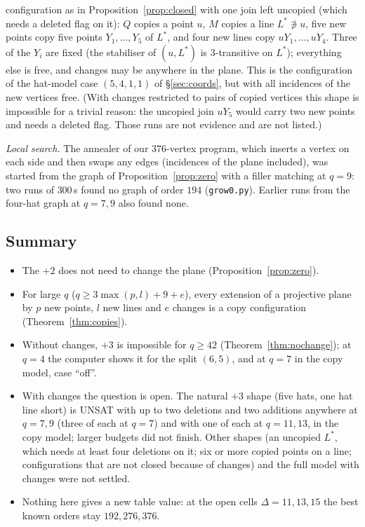 configuration as in Proposition~\ref{prop:closed} with one join left uncopied (which needs a deleted flag on it): $Q$ copies a point $u$, $M$ copies a line $L^* \not\ni u$,
five new points copy five points $Y_1, \dots, Y_5$ of $L^*$, and four new lines copy $uY_1, \dots, uY_4$. Three of the
$Y_i$ are fixed (the stabiliser of $(u, L^*)$ is $3$-transitive on $L^*$); everything else is free, and changes may
be anywhere in the plane. This is the configuration of the hat-model case $(5,4,1,1)$ of \S\ref{sec:coords}, but with
all incidences of the new vertices free. (With changes restricted to pairs of copied vertices this shape is impossible
for a trivial reason: the uncopied join $uY_5$ would carry two new points and needs a deleted flag. Those runs are not
evidence and are not listed.)

\emph{Local search.} The annealer of our $376$-vertex program, which inserts a vertex on each side and then swaps any
edges (incidences of the plane included), was started from the graph of Proposition~\ref{prop:zero} with a filler
matching at $q = 9$: two runs of $300$\,s found no graph of order $194$ (\texttt{grow0.py}). Earlier runs from the
four-hat graph at $q = 7, 9$ also found none.

\subsection{Summary}\label{ssec:plus3sum}
\begin{itemize}
\item The $+2$ does not need to change the plane (Proposition~\ref{prop:zero}).
\item For large $q$ ($q \ge 3\max(p,l)+9+e$), every extension of a projective plane by $p$ new points, $l$ new lines and
$e$ changes is a copy configuration (Theorem~\ref{thm:copies}).
\item Without changes, $+3$ is impossible for $q \ge 42$ (Theorem~\ref{thm:nochange}); at $q = 4$ the computer shows
it for the split $(6,5)$, and at $q = 7$ in the copy model, case ``off''.
\item With changes the question is open. The natural $+3$ shape (five hats, one hat line short) is UNSAT with up to two
deletions and two additions anywhere at $q = 7, 9$ (three of each at $q = 7$) and with one of each at $q = 11, 13$,
in the copy model; larger budgets did not finish. Other shapes
(an uncopied $L^*$, which needs at least four deletions on it; six or more copied points on a line; configurations
that are not closed because of changes) and the full model with changes were not settled.
\item Nothing here gives a new table value: at the open cells $\Delta = 11, 13, 15$ the best known orders stay
$192, 276, 376$.
\end{itemize}

